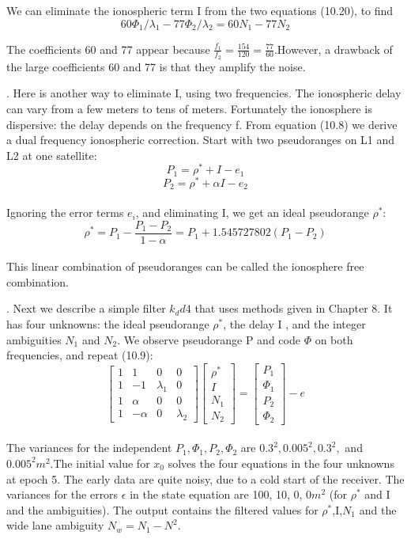 We can eliminate the ionospheric term I from the two equations (10.20), to find
\begin{equation}
60\Phi_{1}/\lambda_{1}-77\Phi_{2}/\lambda_{2}=60N_{1}-77N_{2}
\end{equation}

The coefficients 60 and 77 appear because $\frac{f_{1}}{f_{2}}=\frac{154}{120}=\frac{77}{60}$.However, a drawback of the large coefficients 60 and 77 is that they amplify the noise.

\uppercase\expandafter{}. Here is another way to eliminate I, using two frequencies. The ionospheric delay can vary from a few meters to tens of meters. Fortunately the ionosphere is dispersive:
the delay depends on the frequency f. From equation (10.8) we derive a dual frequency
ionospheric correction. Start with two pseudoranges on L1 and L2 at one satellite:
$$
P_{1}=\rho^{*}+I-e_{1}
$$
$$
P_{2}=\rho^{*}+\alpha I-e_{2}
$$\\
Ignoring the error terms $e_{i}$, and eliminating I, we get an ideal pseudorange $\rho^{*}$:
$$
\rho^{*}=P_{1}-\frac{P_{1}-P_{2}}{1-\alpha}=P_{1}+1.545727802(P_{1}-P_{2})
$$\\
This linear combination of pseudoranges can be called the ionosphere free combination.

\uppercase\expandafter{}. Next we describe a simple filter $k_dd4$ that uses methods given in Chapter 8. It has four unknowns: the ideal pseudorange $\rho^{*}$, the delay I , and the integer ambiguities $N_{1}$ and $N_{2}$. We observe pseudorange P and code $\Phi$ on both frequencies, and repeat (10.9):
$$
\begin{bmatrix}
1&1&0&0\\
1&-1&\lambda_{1}&0\\
1&\alpha&0&0\\
1&-\alpha&0&\lambda_{2}
\end{bmatrix}
\begin{bmatrix}
\rho^{*}\\I\\N_{1}\\N_{2}
\end{bmatrix}
=
\begin{bmatrix}
P_{1}\\\Phi_{1}\\P_{2}\\\Phi_{2}
\end{bmatrix}
-e
$$\\
The variances for the independent $P_{1},\Phi_{1},P_{2},\Phi_{2}$ are $0.3^{2} , 0.005^{2} , 0.3^{2},$ and $0.005^{2} m^{2} $.The initial value for $x_{0}$ solves the four equations in the four unknowns at epoch 5. The early data are quite noisy, due to a cold start of the receiver. The variances for the errors $\epsilon$ in the state equation are 100, 10, 0, 0$m^{2}$ (for $\rho^{*}$ and I and the ambiguities). The output contains the filtered values for $\rho^{*}$,I,$N_{1}$ and the wide lane ambiguity $N_{w}=N_{1}-N^{2}$.

